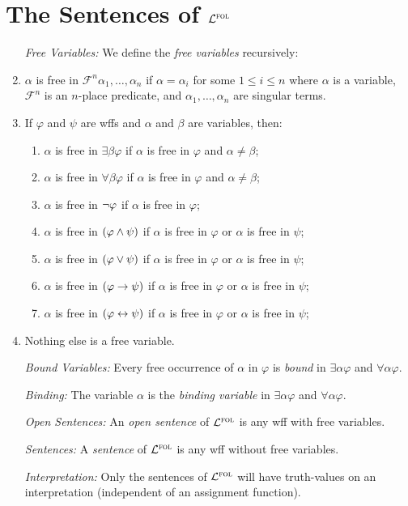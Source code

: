 \documentclass[a4paper, 11pt]{article} %
\begin{document}
\section*{The Sentences of $\mathcal{L}^{\textsc{fol}}$}

\begin{enumerate}
  \item[\it Free Variables:] We define the \textit{free variables} recursively:
  \item $\alpha$ is free in $\mathcal{F}^n\alpha_1,\ldots,\alpha_n$ if $\alpha=\alpha_i$ for some $1\leq i\leq n$ where $\alpha$ is a variable, $\mathcal{F}^n$ is an $n$-place predicate, and $\alpha_1,\ldots,\alpha_n$ are singular terms.
  \item If $\varphi$ and $\psi$ are wffs and $\alpha$ and $\beta$ are variables, then:
    \begin{enumerate}
        \item $\alpha$ is free in $\exists\beta\varphi$ if $\alpha$ is free in $\varphi$ and $\alpha\neq\beta$;
        \item $\alpha$ is free in $\forall\beta\varphi$ if $\alpha$ is free in $\varphi$ and $\alpha\neq\beta$;
        \item $\alpha$ is free in $\neg\varphi$ if $\alpha$ is free in $\varphi$;
        \item $\alpha$ is free in $(\varphi\wedge\psi)$ if $\alpha$ is free in $\varphi$ or $\alpha$ is free in $\psi$;
        \item $\alpha$ is free in $(\varphi\vee\psi)$ if $\alpha$ is free in $\varphi$ or $\alpha$ is free in $\psi$;
        \item $\alpha$ is free in $(\varphi\rightarrow\psi)$ if $\alpha$ is free in $\varphi$ or $\alpha$ is free in $\psi$;
        \item $\alpha$ is free in $(\varphi\leftrightarrow\psi)$ if $\alpha$ is free in $\varphi$ or $\alpha$ is free in $\psi$;
    \end{enumerate}
  \item Nothing else is a free variable. 
  \item[\it Bound Variables:] Every free occurrence of $\alpha$ in $\varphi$ is \textit{bound} in $\exists\alpha\varphi$ and $\forall\alpha\varphi$. 
  \item[\it Binding:] The variable $\alpha$ is the \textit{binding variable} in $\exists\alpha\varphi$ and $\forall\alpha\varphi$.
  \item[\it Open Sentences:] An \textit{open sentence} of $\mathcal{L}^{\textsc{fol}}$ is any wff with free variables.
  \item[\it Sentences:] A \textit{sentence} of $\mathcal{L}^{\textsc{fol}}$ is any wff without free variables.
  \item[\it Interpretation:] Only the sentences of $\mathcal{L}^{\textsc{fol}}$ will have truth-values on an interpretation (independent of an assignment function).
\end{enumerate}
\end{document}
